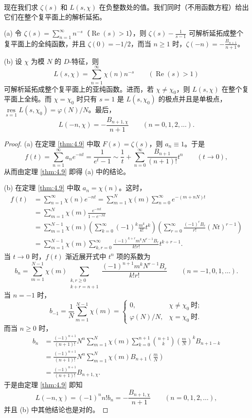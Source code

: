 现在我们求 $\zeta(s)$ 和 $L(s,\chi)$ 在负整数处的值。我们同时（不用函数方程）给出它们在整个复平面上的解析延拓。

\begin{theorem}\label{thm:4.11}
(a) 令 $\zeta(s)=\sum_{n=1}^{\infty}n^{-s}$（$\operatorname{Re}(s)>1$），则 $\zeta(s)-\frac{1}{s-1}$ 可解析延拓成整个复平面上的全纯函数，并且 $\zeta(0)=-1/2$，而当 $n\geqslant 1$ 时，$\zeta(-n)=-\frac{B_{n+1}}{n+1}$。

(b) 设 $\chi$ 为模 $N$ 的 $D$-特征，则
\[
  L(s,\chi)=\sum_{n=1}^{\infty}\chi(n)n^{-s}\qquad(\operatorname{Re}(s)>1)
\]
可解析延拓成整个复平面上的亚纯函数。进而，若 $\chi\neq\chi_0$，则 $L(s,\chi)$ 在整个复平面上全纯。而 $\chi=\chi_0$ 时只有 $s=1$ 是 $L(s,\chi_0)$ 的极点并且是单极点，$\underset{s=1}{\operatorname{res}}L(s,\chi_0)=\varphi(N)/N$。最后，
\[
  L(-n,\chi)=-\frac{B_{n+1,\chi}}{n+1}\qquad(n=0,1,2,\dots).
\]
\end{theorem}

\begin{proof}
(a) 在定理 \ref{thm:4.9} 中取 $F(s)=\zeta(s)$，则 $a_n\equiv 1$。于是
\[
  f(t)=\sum_{n=1}^{\infty}a_ne^{-nt}=\frac{1}{e^t-1}\sim\frac{1}{t}+\sum_{n=0}^{\infty}\frac{B_{n+1}}{(n+1)!}t^n\qquad(t\to0),
\]
从而由定理 \ref{thm:4.9} 即得 (a) 中的结论。

(b) 在定理 \ref{thm:4.9} 中取 $a_n=\chi(n)$。这时，
\begin{align*}
  f(t)&=\sum_{n=1}^{\infty}\chi(n)e^{-nt}=\sum_{m=1}^{N}\chi(m)\sum_{n=0}^{\infty}e^{-(m+nN)t}\\
  &=\sum_{m=1}^{N}\chi(m)\frac{e^{-mt}}{1-e^{-Nt}}\\
  &=\sum_{m=1}^{N-1}\chi(m)\left(\sum_{k=0}^{\infty}(-1)^k\frac{m^k}{k!}t^k\right)\left(\sum_{r=0}^{\infty}\frac{(-1)^rB_r}{r!}(Nt)^{r-1}\right)\\
  &=\sum_{m=1}^{N-1}\chi(m)\sum_{k,r=0}^{\infty}\frac{(-1)^{k+r}m^kN^{r-1}B_r}{k!r!}t^{k+r-1}.
\end{align*}
当 $t\to0$ 时，$f(t)$ 渐近展开式中 $t^n$ 项的系数为
\[
  b_n=\sum_{m=1}^{N-1}\chi(m)\sum_{\substack{k,r\geqslant 0\\ k+r=n+1}}\frac{(-1)^{n+1}m^kN^{r-1}B_r}{k!r!}\qquad(n=-1,0,1,\dots).
\]
当 $n=-1$ 时，
\[
  b_{-1}=\frac{1}{N}\sum_{m=1}^{N-1}\chi(m)=\begin{cases}
    0, & \chi\neq\chi_0\ \text{时};\\
    \varphi(N)/N, & \chi=\chi_0\ \text{时}.
  \end{cases}
\]
而当 $n\geqslant 0$ 时，
\begin{align*}
  b_n&=\frac{(-1)^{n+1}}{(n+1)!}N^n\sum_{m=1}^{N}\chi(m)\sum_{k=0}^{n+1}\binom{n+1}{k}\left(\frac{m}{N}\right)^kB_{n+1-k}\\
  &=\frac{(-1)^{n+1}}{(n+1)!}N^n\sum_{m=1}^{N}\chi(m)B_{n+1}\left(\frac{m}{N}\right)\\
  &=\frac{(-1)^{n+1}}{(n+1)!}B_{n+1,\chi}.
\end{align*}
于是由定理 \ref{thm:4.9} 即知
\[
  L(-n,\chi)=(-1)^nn!b_n=-\frac{B_{n+1,\chi}}{n+1}\qquad(n=0,1,2,\dots),
\]
并且 (b) 中其他结论也是对的。
\end{proof}

